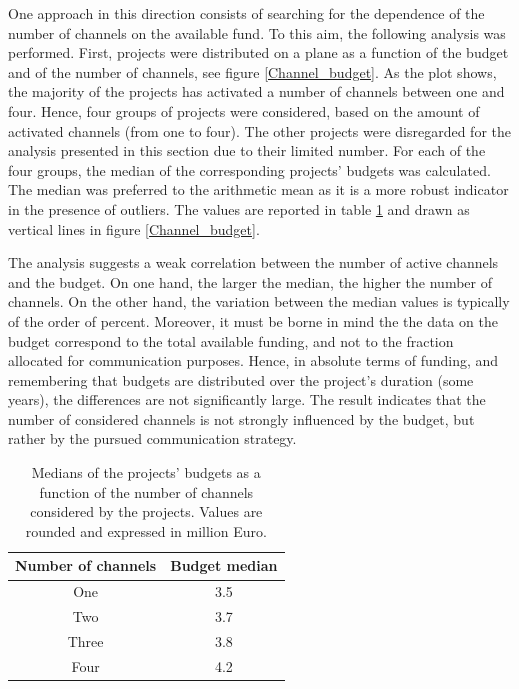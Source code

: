 One approach in this direction consists of searching for the dependence of the number of channels on the available fund. To this aim, the following analysis was performed. First, projects were distributed on a plane as a function of the budget and of the number of channels, see figure \ref{Channel_budget}. As the plot shows, the majority of the projects has activated a number of channels between one and four. Hence, four groups of projects were considered, based on the amount of activated channels (from one to four). The other projects were disregarded for the analysis presented in this section due to their limited number. For each of the four groups, the median of the corresponding projects' budgets was calculated. The median was preferred to the arithmetic mean as it is a more robust indicator in the presence of outliers. The values are reported in table \ref{Median} and drawn as vertical lines in figure \ref{Channel_budget}. 

The analysis suggests a weak correlation between the number of active channels and the budget. On one hand, the larger the median, the higher the number of channels. On the other hand, the variation between the median values is typically of the order of percent. Moreover, it must be borne in mind the the data on the budget correspond to the total available funding, and not to the fraction allocated for communication purposes. Hence, in absolute terms of funding, and remembering that budgets are distributed over the project's duration (some years), the differences are not significantly large. The result indicates that the number of considered channels is not strongly influenced by the budget, but rather by the pursued communication strategy. 

\begin{table}[t]
 \begin{center}
  \begin{tabular}{cc}
   \hline 
   \hline
   Number of channels & Budget median \\ 
   \hline
   \hline
   One & 3.5 \\
   Two & 3.7 \\
   Three & 3.8 \\
   Four & 4.2 \\
   \hline
   \hline
  \end{tabular}
 \end{center} 
 \caption{Medians of the projects' budgets as a function of the number of channels considered by the projects. Values are rounded and expressed in million Euro.}
\label{Median} 
\end{table}

